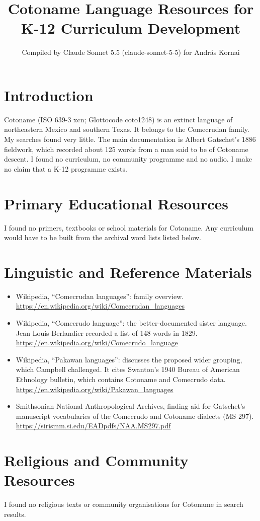 \documentclass[12pt]{article}
\title{Cotoname Language Resources for K-12 Curriculum Development}
\author{Compiled by Claude Sonnet 5.5 (claude-sonnet-5-5) for Andr\'as Kornai}
\date{}
\begin{document}
\maketitle

\section{Introduction}
Cotoname (ISO 639-3 xcn; Glottocode coto1248) is an extinct language of northeastern Mexico and southern Texas. It belongs to the Comecrudan family. My searches found very little. The main documentation is Albert Gatschet's 1886 fieldwork, which recorded about 125 words from a man said to be of Cotoname descent. I found no curriculum, no community programme and no audio. I make no claim that a K-12 programme exists.

\section{Primary Educational Resources}
I found no primers, textbooks or school materials for Cotoname. Any curriculum would have to be built from the archival word lists listed below.

\section{Linguistic and Reference Materials}
\begin{itemize}
\item Wikipedia, ``Comecrudan languages'': family overview. \url{https://en.wikipedia.org/wiki/Comecrudan_languages}
\item Wikipedia, ``Comecrudo language'': the better-documented sister language. Jean Louis Berlandier recorded a list of 148 words in 1829. \url{https://en.wikipedia.org/wiki/Comecrudo_language}
\item Wikipedia, ``Pakawan languages'': discusses the proposed wider grouping, which Campbell challenged. It cites Swanton's 1940 Bureau of American Ethnology bulletin, which contains Cotoname and Comecrudo data. \url{https://en.wikipedia.org/wiki/Pakawan_languages}
\item Smithsonian National Anthropological Archives, finding aid for Gatschet's manuscript vocabularies of the Comecrudo and Cotoname dialects (MS 297). \url{https://sirismm.si.edu/EADpdfs/NAA.MS297.pdf}
\end{itemize}

\section{Religious and Community Resources}
I found no religious texts or community organisations for Cotoname in search results.
\end{document}
